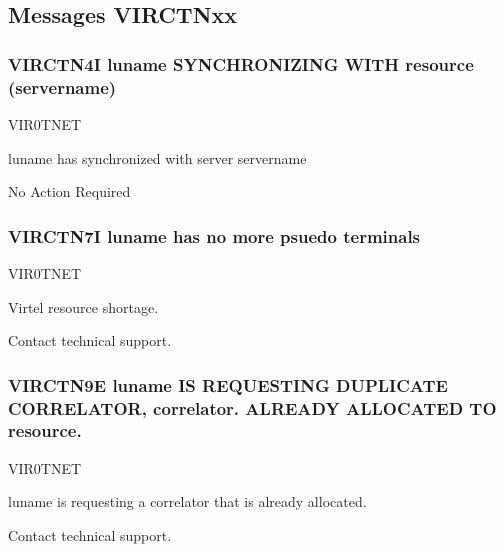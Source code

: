 \documentclass[letterpaper,10pt,english]{sphinxmanual}
\begin{document}
\subsection{Messages VIRCTNxx}
\label{\detokenize{messages:messages-virctnxx}}

\subsubsection{VIRCTN4I luname SYNCHRONIZING WITH resource (servername)}
\label{\detokenize{messages:virctn4i-luname-synchronizing-with-resource-servername}}\begin{description}
\sphinxAtStartPar
VIR0TNET

\sphinxAtStartPar
luname has synchronized with server servername

\sphinxAtStartPar
No Action Required

\end{description}


\subsubsection{VIRCTN7I luname has no more psuedo terminals}
\label{\detokenize{messages:virctn7i-luname-has-no-more-psuedo-terminals}}\begin{description}
\sphinxAtStartPar
VIR0TNET

\sphinxAtStartPar
Virtel resource shortage.

\sphinxAtStartPar
Contact technical support.

\end{description}


\subsubsection{VIRCTN9E luname IS REQUESTING DUPLICATE CORRELATOR, correlator. ALREADY ALLOCATED TO resource.}
\label{\detokenize{messages:virctn9e-luname-is-requesting-duplicate-correlator-correlator-already-allocated-to-resource}}\begin{description}
\sphinxAtStartPar
VIR0TNET

\sphinxAtStartPar
luname is requesting a correlator that is already allocated.

\sphinxAtStartPar
Contact technical support.

\end{description}
\end{document}
